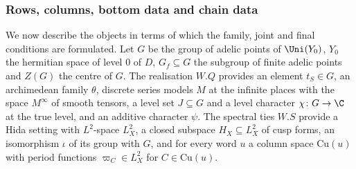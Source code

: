 \subsubsection{Rows, columns, bottom data and chain data}\label{sec:pf:open0a:objects}
We now describe the objects in terms of which the family, joint and final conditions are formulated. Let $G$ be the
group of adelic points of $\Uni(Y_0)$, $Y_0$ the hermitian space of level $0$ of $D$, $G_f\subseteq G$ the subgroup of
finite adelic points and $Z(G)$ the centre of $G$. The realisation $W.Q$ provides an element $t_S\in G$, an archimedean
family $\theta$, discrete series models $M$ at the infinite places with the space $M^{\infty}$ of smooth tensors, a
level set $J\subseteq G$ and a level character $\chi\colon G\to\C$ at the true level, and an additive character $\psi$.
The spectral ties $W.S$ provide a Hida setting with $L^2$-space $L^2_X$, a closed subspace $H_X\subseteq L^2_X$ of cusp
forms, an isomorphism $\iota$ of its group with $G$, and for every word $u$ a column space $\mathrm{Cu}(u)$ with period
functions $\varpi_C\in L^2_X$ for $C\in\mathrm{Cu}(u)$.
